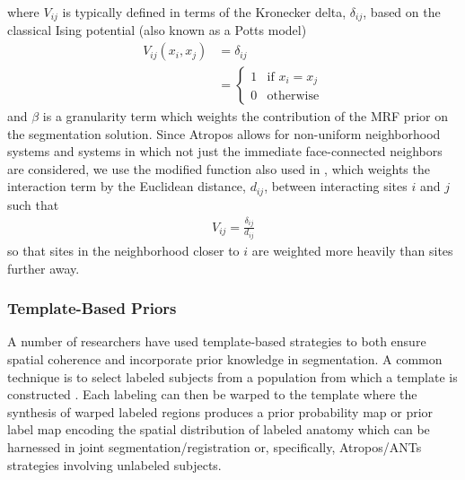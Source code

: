 \documentclass[11pt,english]{article}
\begin{document}
where $V_{ij}$ is typically defined in terms of the Kronecker delta,
$\delta_{ij}$, based on the classical Ising potential (also known as a Potts model) \citep{Besag1974}
\begin{align}
V_{ij}(x_i, x_j) &= \delta_{ij} \nonumber \\
                          &= \left\{
                          \begin{array}{ll}
                            1 & \text{if } x_i = x_j \\
                            0 & \text{otherwise}
                          \end{array}
                         \right.   
\end{align}
and $\beta$ is a granularity term which weights the contribution of the MRF prior on the segmentation solution.
Since Atropos allows for non-uniform neighborhood systems and systems in which not just the immediate face-connected neighbors are considered, we use the modified function also used in \cite{Noe2001}, which weights the interaction term by the Euclidean distance, $d_{ij}$,  between interacting sites $i$ and $j$ such that 
\begin{align}
  V_{ij} = \frac{\delta_{ij}}{d_{ij}}
\end{align}
so that sites in the neighborhood closer to $i$ are weighted more heavily than sites further away.

\subsubsection{Template-Based Priors}
A number of researchers have used template-based strategies to both ensure spatial coherence and incorporate prior knowledge in segmentation.  A common technique is to select labeled subjects from a population from which a template is constructed \citep[e.g.][which is also available in the ANTs toolkit]{Avants2010}.  Each labeling can then be warped to the template where the synthesis of warped labeled regions produces a prior probability map or prior label map encoding the spatial distribution of labeled anatomy which can be harnessed in joint segmentation/registration or, specifically, Atropos/ANTs strategies involving unlabeled subjects.
\end{document}
